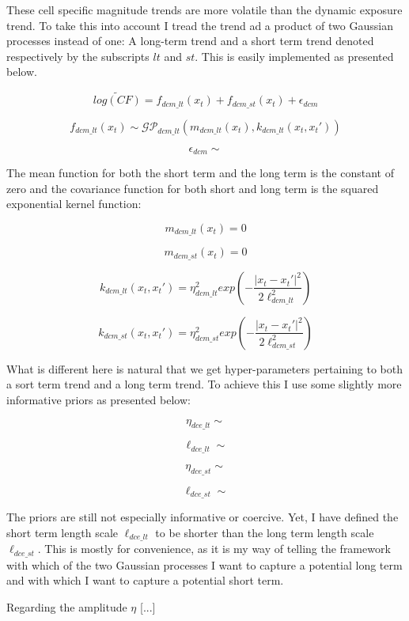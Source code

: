 \documentclass[a4paper]{article}
\begin{document}
These cell specific magnitude trends are more volatile than the dynamic exposure trend. To take this into account I tread the trend ad a product of two Gaussian processes instead of one: A long-term trend and a short term trend denoted respectively by the subscripts $lt$ and $st$. This is easily implemented as presented below.\par

\[
\widetilde{log(CF)} = f_{dcm\_lt}(x_t) + f_{dcm\_st}(x_t) + \epsilon_{dcm}
\]

\[
f_{dcm\_lt}(x_t) \sim \mathcal{GP}_{dcm\_lt}(m_{dcm\_lt}(x_t),k_{dcm\_lt}(x_t,x_t')) %
\]

\[
\epsilon_{dcm} \sim 
\]

The mean function for both the short term and the long term is the constant of zero and the covariance function for both short and long term is the squared exponential kernel function:

\[
m_{dcm\_lt}(x_t) = 0
\]

\[
m_{dcm\_st}(x_t) = 0
\]

\[
k_{dcm\_lt}(x_t,x_t') = \eta_{dcm\_lt}^2 exp\left(-\frac{|x_t-x_t'|^2}{2\ell_{dcm\_lt}^2}\right) %
\]

\[
k_{dcm\_st}(x_t,x_t') = \eta_{dcm\_st}^2 exp\left(-\frac{|x_t-x_t'|^2}{2\ell_{dcm\_st}^2}\right) %
\]

What is different here is natural that we get hyper-parameters pertaining to both a sort term trend and a long term trend. To achieve this I use some slightly more informative priors as presented below:

\[
\eta_{dce\_lt} \sim
\]

\[
\ell_{dce\_lt} \sim
\]

\[
\eta_{dce\_st} \sim
\]

\[
\ell_{dce\_st} \sim
\]

The priors are still not especially informative or coercive. Yet, I have defined the short term length scale $\ell_{dce\_lt}$ to be shorter than the long term length scale $\ell_{dce\_st}$. This is mostly for convenience, as it is my way of telling the framework with which of the two Gaussian processes I want to capture a potential long term and with which I want to capture a potential short term.\par

Regarding the amplitude $\eta$ [...]

\end{document}
